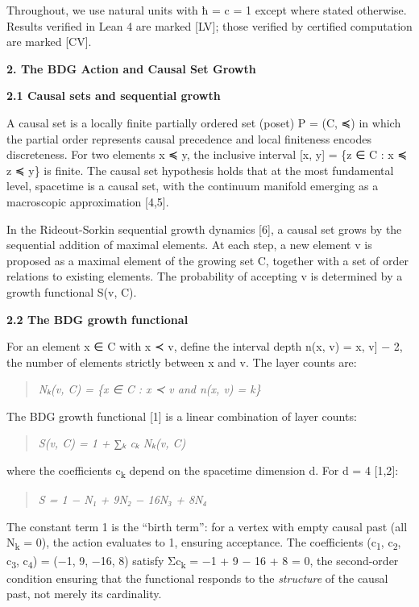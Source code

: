 \documentclass[12pt,a4paper]{article}
\begin{document}
Throughout, we use natural units with ħ = c = 1 except where stated
otherwise. Results verified in Lean 4 are marked {[}LV{]}; those
verified by certified computation are marked {[}CV{]}.

\textbf{2. The BDG Action and Causal Set Growth}

\textbf{2.1 Causal sets and sequential growth}

A causal set is a locally finite partially ordered set (poset) P = (C,
≼) in which the partial order represents causal precedence and local
finiteness encodes discreteness. For two elements x ≼ y, the inclusive
interval {[}x, y{]} = \{z ∈ C : x ≼ z ≼ y\} is finite. The causal set
hypothesis holds that at the most fundamental level, spacetime is a
causal set, with the continuum manifold emerging as a macroscopic
approximation {[}4,5{]}.

In the Rideout-Sorkin sequential growth dynamics {[}6{]}, a causal set
grows by the sequential addition of maximal elements. At each step, a
new element v is proposed as a maximal element of the growing set C,
together with a set of order relations to existing elements. The
probability of accepting v is determined by a growth functional S(v, C).

\textbf{2.2 The BDG growth functional}

For an element x ∈ C with x ≺ v, define the interval depth n(x, v) =
\textbar{[}x, v{]}\textbar{} − 2, the number of elements strictly
between x and v. The layer counts are:

\begin{quote}
\emph{Nₖ(v, C) = \textbar\{x ∈ C : x ≺ v and n(x, v) = k\}\textbar{}}
\end{quote}

The BDG growth functional {[}1{]} is a linear combination of layer
counts:

\begin{quote}
\emph{S(v, C) = 1 + ∑ₖ cₖ Nₖ(v, C)}
\end{quote}

where the coefficients c\textsubscript{k} depend on the spacetime
dimension d. For d = 4 {[}1,2{]}:

\begin{quote}
\emph{S = 1 − N₁ + 9N₂ − 16N₃ + 8N₄}
\end{quote}

The constant term 1 is the ``birth term'': for a vertex with empty
causal past (all N\textsubscript{k} = 0), the action evaluates to 1,
ensuring acceptance. The coefficients (c\textsubscript{1},
c\textsubscript{2}, c\textsubscript{3}, c\textsubscript{4}) = (−1, 9,
−16, 8) satisfy Σc\textsubscript{k} = −1 + 9 − 16 + 8 = 0, the
second-order condition ensuring that the functional responds to the
\emph{structure} of the causal past, not merely its cardinality.
\end{document}
